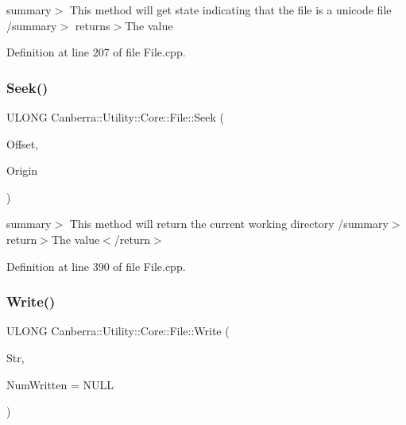 summary$>$ This method will get state indicating that the file is a unicode file /summary$>$ returns$>$The value

Definition at line 207 of file File.\+cpp.

\mbox{\label{class_canberra_1_1_utility_1_1_core_1_1_file_a534c906d5b1c4788048ad5b7da3d02a7_a534c906d5b1c4788048ad5b7da3d02a7}} 
\subsubsection{\texorpdfstring{Seek()}{Seek()}}
{\footnotesize\ttfamily U\+L\+O\+NG Canberra\+::\+Utility\+::\+Core\+::\+File\+::\+Seek (\begin{DoxyParamCaption}\item[{L\+O\+NG}]{Offset,  }\item[{L\+O\+NG}]{Origin }\end{DoxyParamCaption})}

summary$>$ This method will return the current working directory /summary$>$ return$>$The value$<$/return$>$ 

Definition at line 390 of file File.\+cpp.

\mbox{\label{class_canberra_1_1_utility_1_1_core_1_1_file_a50a22791ec993eee5974d942d54b3f5e_a50a22791ec993eee5974d942d54b3f5e}} 
\subsubsection{\texorpdfstring{Write()}{Write()}\hspace{0.1cm}{\footnotesize\ttfamily [1/2]}}
{\footnotesize\ttfamily U\+L\+O\+NG Canberra\+::\+Utility\+::\+Core\+::\+File\+::\+Write (\begin{DoxyParamCaption}\item[{const \hyperlink{class_canberra_1_1_utility_1_1_core_1_1_byte_stream}{Byte\+Stream} \&}]{Str,  }\item[{U\+L\+O\+NG $\ast$}]{Num\+Written = {\ttfamily NULL} }\end{DoxyParamCaption})}

